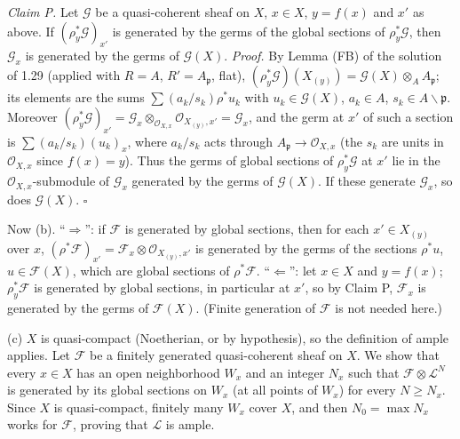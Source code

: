 \documentclass[11pt]{article}
\begin{document}
\emph{Claim P.} Let $\mathcal{G}$ be a quasi-coherent sheaf on $X$, $x\in X$, $y=f(x)$ and $x'$ as above. If $(\rho_y^*\mathcal{G})_{x'}$ is generated by the germs of the global sections of $\rho_y^*\mathcal{G}$, then $\mathcal{G}_x$ is generated by the germs of $\mathcal{G}(X)$.
\emph{Proof.} By Lemma (FB) of the solution of 1.29 (applied with $R=A$, $R'=A_\mathfrak{p}$, flat), $(\rho_y^*\mathcal{G})(X_{(y)})=\mathcal{G}(X)\otimes_AA_\mathfrak{p}$; its elements are the sums $\sum(a_k/s_k)\rho^*u_k$ with $u_k\in\mathcal{G}(X)$, $a_k\in A$, $s_k\in A\smallsetminus\mathfrak{p}$. Moreover $(\rho_y^*\mathcal{G})_{x'}=\mathcal{G}_x\otimes_{\mathcal{O}_{X,x}}\mathcal{O}_{X_{(y)},x'}=\mathcal{G}_x$, and the germ at $x'$ of such a section is $\sum(a_k/s_k)(u_k)_x$, where $a_k/s_k$ acts through $A_\mathfrak{p}\to\mathcal{O}_{X,x}$ (the $s_k$ are units in $\mathcal{O}_{X,x}$ since $f(x)=y$). Thus the germs of global sections of $\rho_y^*\mathcal{G}$ at $x'$ lie in the $\mathcal{O}_{X,x}$-submodule of $\mathcal{G}_x$ generated by the germs of $\mathcal{G}(X)$. If these generate $\mathcal{G}_x$, so does $\mathcal{G}(X)$. $\square$

Now (b). ``$\Rightarrow$'': if $\mathcal{F}$ is generated by global sections, then for each $x'\in X_{(y)}$ over $x$, $(\rho^*\mathcal{F})_{x'}=\mathcal{F}_x\otimes\mathcal{O}_{X_{(y)},x'}$ is generated by the germs of the sections $\rho^*u$, $u\in\mathcal{F}(X)$, which are global sections of $\rho^*\mathcal{F}$. ``$\Leftarrow$'': let $x\in X$ and $y=f(x)$; $\rho_y^*\mathcal{F}$ is generated by global sections, in particular at $x'$, so by Claim P, $\mathcal{F}_x$ is generated by the germs of $\mathcal{F}(X)$. (Finite generation of $\mathcal{F}$ is not needed here.)

(c) $X$ is quasi-compact (Noetherian, or by hypothesis), so the definition of ample applies. Let $\mathcal{F}$ be a finitely generated quasi-coherent sheaf on $X$. We show that every $x\in X$ has an open neighborhood $W_x$ and an integer $N_x$ such that $\mathcal{F}\otimes\mathcal{L}^N$ is generated by its global sections on $W_x$ (at all points of $W_x$) for every $N\ge N_x$. Since $X$ is quasi-compact, finitely many $W_x$ cover $X$, and then $N_0=\max N_x$ works for $\mathcal{F}$, proving that $\mathcal{L}$ is ample.
\end{document}
